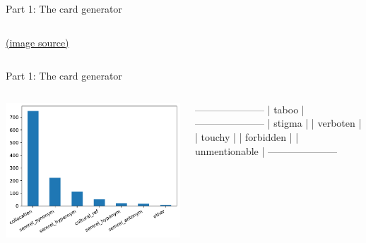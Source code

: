 \documentclass[11pt]{beamer}
\begin{document}
\begin{frame}{Part 1: The card generator}
\begin{columns}
\begin{column}{0.5\textwidth}
		\hfill {\tiny \href{https://www.amazon.com/Hasbro-Gaming-Buzzer-Amazon-Exclusive/dp/B06XYL6Y5C}{(image source)} }
		
	\end{column}


	
\end{columns}

\end{frame}


\begin{frame}[fragile]{Part 1: The card generator}



\begin{columns}
	
\begin{column}{0.65\textwidth}

\begin{center}
	\includegraphics[width=\linewidth]{freq_plot.pdf}
\end{center}

\end{column}

\begin{column}{0.35\textwidth}

\vspace{-\baselineskip}

{\scriptsize
\begin{semiverbatim}
---------------------
|   taboo           |
---------------------
|   stigma          |
|   verboten        |
|   touchy          |
|   forbidden       |
|   unmentionable   |
---------------------
\end{semiverbatim}
}
\end{column}

\end{columns}

\end{frame}
\end{document}
